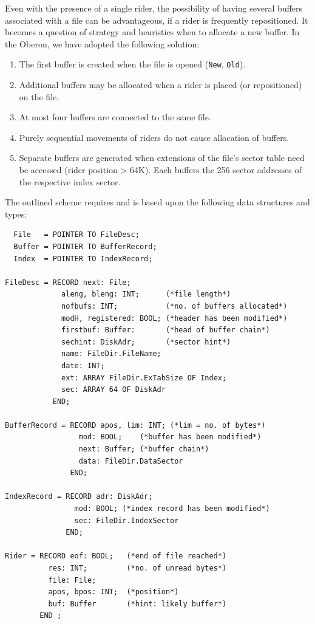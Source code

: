 Even with the presence of a single rider, the possibility of having several buffers associated with a
file can be advantageous, if a rider is frequently repositioned. It becomes a question of strategy and
heuristics when to allocate a new buffer. In the Oberon, we have adopted the following solution:
\begin{enumerate}
  \item The first buffer is created when the file is opened (\verb|New|, \verb|Old|).
  \item Additional buffers may be allocated when a rider is placed (or repositioned) on the file.
  \item At most four buffers are connected to the same file.
  \item Purely sequential movements of riders do not cause allocation of buffers.
  \item Separate buffers are generated when extensions of the file's sector table need be accessed
    (rider position > 64K). Each buffers the 256 sector addresses of the respective index sector.
\end{enumerate}

The outlined scheme requires and is based upon the following data structures and types:
\begin{verbatim}
  File   = POINTER TO FileDesc;
  Buffer = POINTER TO BufferRecord;
  Index  = POINTER TO IndexRecord;

FileDesc = RECORD next: File;
             aleng, bleng: INT;      (*file length*)
             nofbufs: INT;           (*no. of buffers allocated*)
             modH, registered: BOOL; (*header has been modified*)
             firstbuf: Buffer:       (*head of buffer chain*)
             sechint: DiskAdr;       (*sector hint*)
             name: FileDir.FileName;
             date: INT;
             ext: ARRAY FileDir.ExTabSize OF Index;
             sec: ARRAY 64 OF DiskAdr
           END;

BufferRecord = RECORD apos, lim: INT; (*lim = no. of bytes*)
                 mod: BOOL;    (*buffer has been modified*)
                 next: Buffer; (*buffer chain*)
                 data: FileDir.DataSector
               END;

IndexRecord = RECORD adr: DiskAdr;
                mod: BOOL; (*index record has been modified*)
                sec: FileDir.IndexSector
              END;

Rider = RECORD eof: BOOL;   (*end of file reached*)
          res: INT;         (*no. of unread bytes*)
          file: File;
          apos, bpos: INT;  (*position*)
          buf: Buffer       (*hint: likely buffer*)
        END ;
\end{verbatim}


